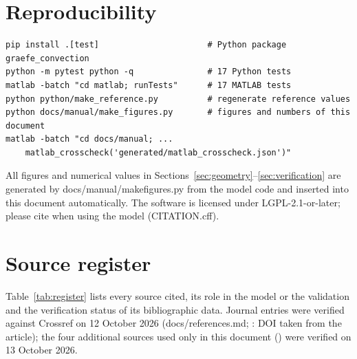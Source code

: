 \documentclass[11pt,a4paper]{article}
\newcommand{\codeus}{\char95\allowbreak}
\DeclareRobustCommand{\code}[1]{\textnormal{\ttfamily\let\_\codeus #1}}
\begin{document}
\section{Reproducibility}\label{sec:repro}
\begin{lstlisting}
pip install .[test]                      # Python package graefe_convection
python -m pytest python -q               # 17 Python tests
matlab -batch "cd matlab; runTests"      # 17 MATLAB tests
python python/make_reference.py          # regenerate reference values
python docs/manual/make_figures.py       # figures and numbers of this document
matlab -batch "cd docs/manual; ...
    matlab_crosscheck('generated/matlab_crosscheck.json')"
\end{lstlisting}
All figures and numerical values in Sections~\ref{sec:geometry}--\ref{sec:verification} are generated by \code{docs/manual/make\_figures.py} from the model code and inserted into this document automatically. The software is licensed under LGPL-2.1-or-later; please cite \citet{graefe2022} when using the model (\code{CITATION.cff}).

\appendix
\section{Source register}\label{app:sources}
Table~\ref{tab:register} lists every source cited, its role in the model or the validation and the verification status of its bibliographic data. Journal entries were verified against Crossref on 12 October 2026 (\code{docs/references.md}; \citealp{ryms2025}: DOI taken from the article); the four additional sources used only in this document (\citealp{campbell1998,monteith1973,pohlhausen1921,sutherland1893}) were verified on 13 October 2026.
\end{document}
